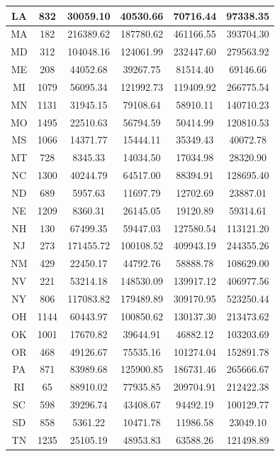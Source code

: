 \documentclass[
  english,
  man]{apa6}
\begin{document}
\begin{table}
\begin{tabular}[t]{c|c|c|c|c|c}
\hline
LA & 832 & 30059.10 & 40530.66 & 70716.44 & 97338.35\\
\hline
MA & 182 & 216389.62 & 187780.62 & 461166.55 & 393704.30\\
\hline
MD & 312 & 104048.16 & 124061.99 & 232447.60 & 279563.92\\
\hline
ME & 208 & 44052.68 & 39267.75 & 81514.40 & 69146.66\\
\hline
MI & 1079 & 56095.34 & 121992.73 & 119409.92 & 266775.54\\
\hline
MN & 1131 & 31945.15 & 79108.64 & 58910.11 & 140710.23\\
\hline
MO & 1495 & 22510.63 & 56794.59 & 50414.99 & 120810.53\\
\hline
MS & 1066 & 14371.77 & 15444.11 & 35349.43 & 40072.78\\
\hline
MT & 728 & 8345.33 & 14034.50 & 17034.98 & 28320.90\\
\hline
NC & 1300 & 40244.79 & 64517.00 & 88394.91 & 128695.40\\
\hline
ND & 689 & 5957.63 & 11697.79 & 12702.69 & 23887.01\\
\hline
NE & 1209 & 8360.31 & 26145.05 & 19120.89 & 59314.61\\
\hline
NH & 130 & 67499.35 & 59447.03 & 127580.54 & 113121.20\\
\hline
NJ & 273 & 171455.72 & 100108.52 & 409943.19 & 244355.26\\
\hline
NM & 429 & 22450.17 & 44792.76 & 58888.78 & 108629.00\\
\hline
NV & 221 & 53214.18 & 148530.09 & 139917.12 & 406977.56\\
\hline
NY & 806 & 117083.82 & 179489.89 & 309170.95 & 523250.44\\
\hline
OH & 1144 & 60443.97 & 100850.62 & 130137.30 & 213473.62\\
\hline
OK & 1001 & 17670.82 & 39644.91 & 46882.12 & 103203.69\\
\hline
OR & 468 & 49126.67 & 75535.16 & 101274.04 & 152891.78\\
\hline
PA & 871 & 83989.68 & 125900.85 & 186731.46 & 265666.67\\
\hline
RI & 65 & 88910.02 & 77935.85 & 209704.91 & 212422.38\\
\hline
SC & 598 & 39296.74 & 43408.67 & 94492.19 & 100129.77\\
\hline
SD & 858 & 5361.22 & 10471.78 & 11986.58 & 23049.10\\
\hline
TN & 1235 & 25105.19 & 48953.83 & 63588.26 & 121498.89\\
\hline

\end{tabular}
\end{table}
\end{document}
